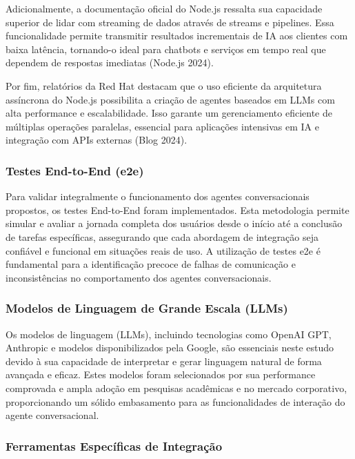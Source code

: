 \documentclass[
]{article}
\begin{document}
Adicionalmente, a documentação oficial do Node.js ressalta sua
capacidade superior de lidar com streaming de dados através de streams e
pipelines. Essa funcionalidade permite transmitir resultados
incrementais de IA aos clientes com baixa latência, tornando-o ideal
para chatbots e serviços em tempo real que dependem de respostas
imediatas (Node.js 2024).

Por fim, relatórios da Red Hat destacam que o uso eficiente da
arquitetura assíncrona do Node.js possibilita a criação de agentes
baseados em LLMs com alta performance e escalabilidade. Isso garante um
gerenciamento eficiente de múltiplas operações paralelas, essencial para
aplicações intensivas em IA e integração com APIs externas (Blog 2024).

\subsubsection{Testes End-to-End (e2e)}\label{testes-end-to-end-e2e}

Para validar integralmente o funcionamento dos agentes conversacionais
propostos, os testes End-to-End foram implementados. Esta metodologia
permite simular e avaliar a jornada completa dos usuários desde o início
até a conclusão de tarefas específicas, assegurando que cada abordagem
de integração seja confiável e funcional em situações reais de uso. A
utilização de testes e2e é fundamental para a identificação precoce de
falhas de comunicação e inconsistências no comportamento dos agentes
conversacionais.

\subsubsection{Modelos de Linguagem de Grande Escala
(LLMs)}\label{modelos-de-linguagem-de-grande-escala-llms}

Os modelos de linguagem (LLMs), incluindo tecnologias como OpenAI GPT,
Anthropic e modelos disponibilizados pela Google, são essenciais neste
estudo devido à sua capacidade de interpretar e gerar linguagem natural
de forma avançada e eficaz. Estes modelos foram selecionados por sua
performance comprovada e ampla adoção em pesquisas acadêmicas e no
mercado corporativo, proporcionando um sólido embasamento para as
funcionalidades de interação do agente conversacional.

\subsubsection{Ferramentas Específicas de
Integração}\label{ferramentas-especuxedficas-de-integrauxe7uxe3o}
\end{document}

